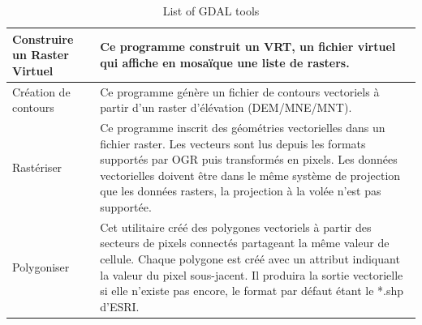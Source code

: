 {\setlength{\extrarowheight}{15pt}
\begin{longtable}{|p{3cm}|p{13cm}|}
\caption{List of GDAL tools}\label{tab:gdaltools} \\
\hline Construire un Raster Virtuel & Ce programme construit un VRT, un fichier virtuel qui affiche en mosaïque une liste de rasters. \\
\hline Création de contours & Ce programme génère un fichier de contours vectoriels à partir d'un raster d'élévation (DEM/MNE/MNT).\\
\hline Rastériser & Ce programme inscrit des géométries vectorielles dans un fichier raster. Les vecteurs sont lus depuis les formats supportés par OGR puis transformés en pixels. Les données vectorielles doivent être dans le même système de projection que les données rasters, la projection à la volée n'est pas supportée.\\
\hline Polygoniser & Cet utilitaire créé des polygones vectoriels à partir des secteurs de pixels connectés partageant la même valeur de cellule. Chaque polygone est créé avec un attribut indiquant la valeur du pixel sous-jacent. Il produira la sortie vectorielle si elle n'existe pas encore, le format par défaut étant le *.shp d'ESRI. \\

\end{longtable}}
